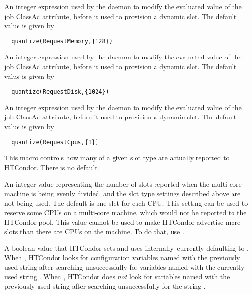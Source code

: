\begin{description}
\label{param:ModifyRequestExprRequestmemory}
\item[\Macro{MODIFY\_REQUEST\_EXPR\_REQUESTMEMORY}]
  An integer expression used by the  daemon to modify the
  evaluated value of the  job ClassAd attribute,
  before it used to provision a dynamic slot. 
  The default value is given by
  \footnotesize
  \begin{verbatim}
  quantize(RequestMemory,{128})
  \end{verbatim}
  \normalsize

\label{param:ModifyRequestExprRequestdisk}
\item[\Macro{MODIFY\_REQUEST\_EXPR\_REQUESTDISK}]
  An integer expression used by the  daemon to modify the
  evaluated value of the  job ClassAd attribute,
  before it used to provision a dynamic slot. 
  The default value is given by
  \footnotesize
  \begin{verbatim}
  quantize(RequestDisk,{1024})
  \end{verbatim}
  \normalsize

\label{param:ModifyRequestExprRequestcpus}
\item[\Macro{MODIFY\_REQUEST\_EXPR\_REQUESTCPUS}]
  An integer expression used by the  daemon to modify the
  evaluated value of the  job ClassAd attribute,
  before it used to provision a dynamic slot. 
  The default value is given by
  \footnotesize
  \begin{verbatim}
  quantize(RequestCpus,{1})
  \end{verbatim}
  \normalsize

\label{param:NumSlotsTypeN}
\item[\Macro{NUM\_SLOTS\_TYPE\_<N>}]
  This macro controls how many of a given slot type
  are actually reported to HTCondor.
  There is no default.

\label{param:NumSlots}
\item[\Macro{NUM\_SLOTS}]
  An integer value representing the number of slots reported when
  the multi-core machine is being evenly divided, and the slot
  type settings described above are not being used.
  The default is one slot for each CPU.
  This setting can be used to reserve some CPUs on a multi-core machine,
  which would
  not be reported to the HTCondor pool.
  This value cannot be used to
  make HTCondor advertise more slots than there are CPUs on the machine.
  To do that, use .

\label{param:AllowVMCruft}
\item[\Macro{ALLOW\_VM\_CRUFT}]
  A boolean value that HTCondor sets and uses internally, currently
  defaulting to .  When ,
  HTCondor looks for configuration variables named with the
  previously used string  after searching unsuccessfully
  for variables named with the currently used string .
  When , HTCondor does \emph{not} look for variables named
  with the previously used string  after searching
  unsuccessfully for the string . 

\end{description}


